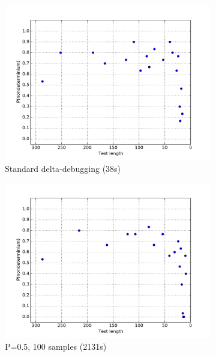 \begin{figure}
\centering 
\begin{subfigure}{0.3\columnwidth}
\centering
\includegraphics[width=\columnwidth]{redisddmin}
\caption{Standard delta-debugging (38s)}
\label{fig:r1}
\end{subfigure}
\begin{subfigure}{0.3\columnwidth}
\centering
\includegraphics[width=\columnwidth]{redisforcep}
\caption{P=0.5, 100 samples (2131s)}
\label{fig:r2}
\end{subfigure}
\begin{subfigure}{0.3\columnwidth}
\centering

\end{subfigure}
\end{figure}
